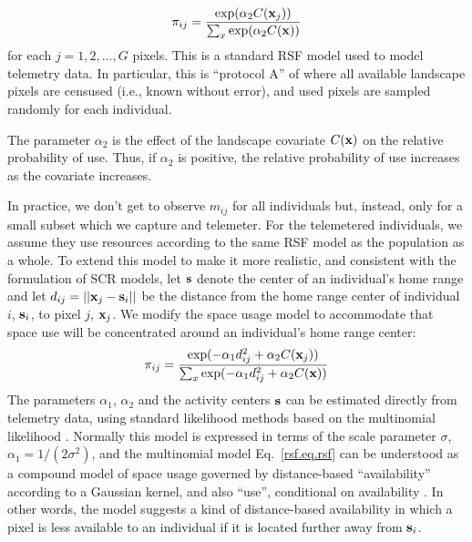\[
 \pi_{ij} = \frac{ \exp( \alpha_{2} C({\bf x}_{j}) ) }{ \sum_{x}
   \exp(\alpha_{2} C({\bf x}))}
\]
for each $j=1,2,\ldots,G$ pixels.
This is a standard RSF model \citep{manly_etal:2002} used to model
telemetry data. In particular, this is ``protocol A'' of
\citep{manly_etal:2002} where all available landscape pixels are censused (i.e., known without error), and
used pixels are sampled randomly for each individual.

The parameter $\alpha_2$ is the effect of the
landscape covariate $C({\bf x})$ on the relative probability of
use. Thus, if $\alpha_2$ is positive, the relative probability of use
increases as the covariate increases.

In practice, we don't get to observe $m_{ij}$ for all individuals but,
instead, only for a small subset which we capture and telemeter.
For the telemetered individuals, we assume
they use resources according to the same RSF model as the population as
a whole.  To extend this model to make it more realistic, and
consistent with the formulation of SCR models, let ${\bf s}$ denote
the center of an individual's home range and let $d_{ij} = ||{\bf
  x}_{j} - {\bf s}_{i}||$ be the distance from the home range center
of individual $i$, ${\bf s}_{i}$, to pixel $j$, ${\bf x}_{j}$. We
modify the space usage model to accommodate that space use will be
concentrated around an individual's home range center:
\begin{equation}
 \pi_{ij} = \frac{ \exp( -\alpha_{1} d_{ij}^{2} +\alpha_{2} C({\bf x}_{j}) ) }
{ \sum_{x} \exp(-\alpha_{1} d_{ij}^{2} +\alpha_{2} C({\bf x}))}
\label{rsf.eq.rsf}
\end{equation}
The parameters
$\alpha_{1}$, $\alpha_{2}$ and the activity centers ${\bf s}$ can be
estimated directly from telemetry data, using standard
likelihood methods based on the multinomial likelihood
\citep{johnson_etal:2008}.
Normally this model is expressed in terms of the scale parameter $\sigma$,
 $\alpha_1=1/(2\sigma^2)$,
and the multinomial model
 Eq.~\ref{rsf.eq.rsf} can be understood as a compound model
of space usage governed by distance-based ``availability'' according
to a Gaussian kernel, and also ``use'', conditional on availability
\citep{johnson_etal:2008, forester_etal:2009}.
In other words, the model suggests a kind of distance-based
availability in which a pixel is less available to an individual if it
is located further away from ${\bf s}_i$.


